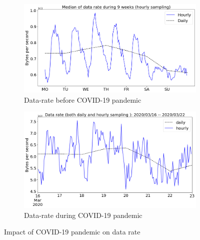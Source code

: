 \documentclass[10pt, journal, letterpaper]{IEEEtran}
\newcommand\linearFigSze{0.48}
\begin{document}
\begin{figure}
    \begin{subfigure}{\linearFigSze\textwidth}
          \centering
          \includegraphics[width=\columnwidth]{img/BCO_byterate.png}
          \caption{Data-rate before COVID-19 pandemic}
          \label{fig:BCO_bps}
    \end{subfigure}
    \begin{subfigure}{\linearFigSze\textwidth}
          \centering
          \includegraphics[width=\columnwidth]{img/CO2_byterate.png}
          \caption{Data-rate during COVID-19 pandemic}
          \label{fig:CO_bps}
    \end{subfigure}
    \caption{Impact of COVID-19 pandemic on data rate}
    \label{fig:datarate_BCO_CO}
\end{figure}
\end{document}
